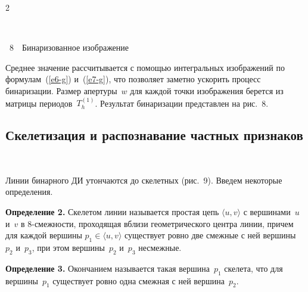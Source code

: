 \begin{multicols}{2}
\begin{center} %
\vspace*{9pt}
\mbox{%
 \epsfxsize=60mm
}
\end{center}
\begin{center}
\vspace*{1pt}
{{\figurename~8}\ \ \small{Бинаризованное изображение}}
\end{center}
\vspace*{11pt}

\addtocounter{figure}{1}


  Среднее значение рассчитывается с помощью интегральных изображений по 
формулам~(\ref{e6-g}) и~(\ref{e7-g}), что позволяет заметно ускорить процесс 
бинаризации. Размер апертуры~$w$ для каждой точки изображения берется из 
матрицы периодов~$T_h^{(1)}$. Результат бинаризации представлен на рис.~8.

\subsection{Скелетизация и распознавание частных признаков} %

\begin{figure} %
 \vspace*{1pt}
 \begin{center}
 \mbox{%
 \epsfxsize=150mm
 }
 \end{center}
 \vspace*{-9pt}
\end{figure}


  Линии бинарного ДИ утончаются до скелетных (рис.~9). Введем 
некоторые определения.
  
  
  \noindent
  \textbf{Определение 2.} Скелетом линии называется прос\-тая цепь $\langle 
u,v\rangle$ с вершинами~$u$ и~$v$ в 8-смеж\-ности, проходящая вблизи 
геометрического центра линии, причем для каждой вершины $p_1\in\langle 
u,v\rangle$ существует ровно две смежные с ней вершины~$p_2$ и~$p_3$, при 
этом вершины~$p_2$ и~$p_3$ несмежные.
  
  \smallskip
  
  \noindent
  \textbf{Определение 3.} Окончанием называется такая вершина~$p_1$ 
скелета, что для вершины~$p_1$ существует ровно одна смежная с ней 
вершина~$p_2$.
  

\end{multicols}
